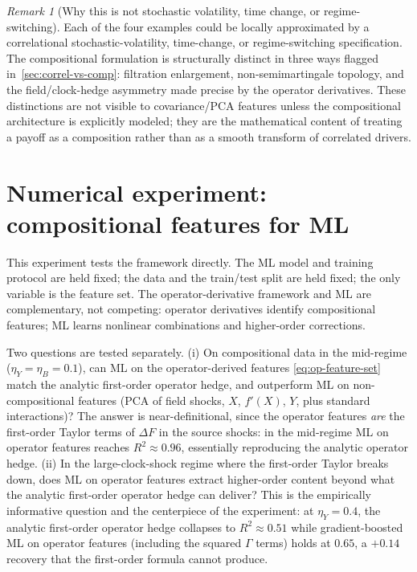 \documentclass[11pt,reqno]{amsart}
\theoremstyle{plain}
\theoremstyle{definition}
\theoremstyle{remark}
\newtheorem{remark}[theorem]{Remark}
\begin{document}
\begin{remark}[Why this is not stochastic volatility, time
change, or regime-switching]\label{rem:not-just}
Each of the four examples could be locally approximated by a
correlational stochastic-volatility, time-change, or
regime-switching specification. The compositional formulation
is structurally distinct in three ways flagged
in~\cref{sec:correl-vs-comp}: filtration enlargement,
non-semimartingale topology, and the field/clock-hedge
asymmetry made precise by the operator derivatives. These
distinctions are not visible to covariance/PCA features unless
the compositional architecture is explicitly modeled; they are
the mathematical content of treating a payoff as a composition
rather than as a smooth transform of correlated drivers.
\end{remark}

\section{Numerical experiment: compositional features for ML}\label{sec:experiment}

This experiment tests the framework directly. The ML model and
training protocol are held fixed; the data and the train/test
split are held fixed; the only variable is the feature set. The
operator-derivative framework and ML are complementary, not
competing: operator derivatives identify compositional features;
ML learns nonlinear combinations and higher-order corrections.

Two questions are tested separately. (i) On compositional data
in the mid-regime ($\eta_{Y}=\eta_{B}=0.1$), can ML on the
operator-derived features
\eqref{eq:op-feature-set} match the analytic first-order
operator hedge, and outperform ML on non-compositional features
(PCA of field shocks, $X$, $f'(X)$, $Y$, plus standard
interactions)? The answer is near-definitional, since the
operator features \emph{are} the first-order Taylor terms
of $\Delta F$ in the source shocks: in the mid-regime ML on
operator features reaches $R^{2}\approx 0.96$, essentially
reproducing the analytic operator hedge. (ii) In the
large-clock-shock regime where the first-order Taylor breaks
down, does ML on operator features extract higher-order
content beyond what the analytic first-order operator hedge
can deliver? This is the empirically informative question and
the centerpiece of the experiment: at $\eta_{Y}=0.4$, the
analytic first-order operator hedge collapses to
$R^{2}\approx 0.51$ while gradient-boosted ML on operator
features (including the squared $\Gamma$ terms) holds at
$0.65$, a $+0.14$ recovery that the first-order formula cannot
produce.
\end{document}
